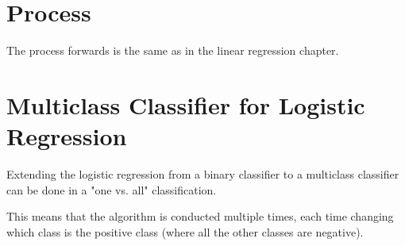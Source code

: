 \section{Process}
The process forwards is the same as in the linear regression chapter.

\section{Multiclass Classifier for Logistic Regression}
Extending the logistic regression from a binary classifier to a multiclass classifier can be done in a "one vs. all" classification.

This means that the algorithm is conducted multiple times, each time changing which class is the positive class (where all the other classes are negative).

